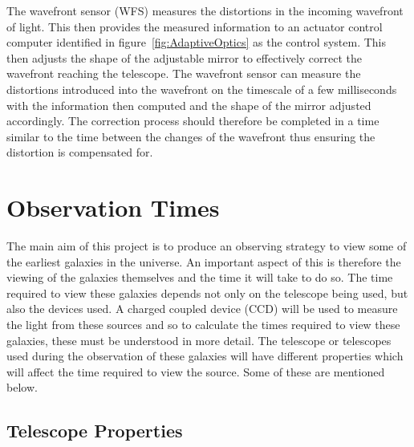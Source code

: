 			The wavefront sensor (WFS) measures the distortions in the incoming wavefront of light. This then provides the measured information to an actuator control computer identified in figure~\ref{fig:AdaptiveOptics} as the control system. This then adjusts the shape of the adjustable mirror to effectively correct the wavefront reaching the telescope\cite{Diffraction_Limited_Imaging_Saha}.  The wavefront sensor can measure the distortions introduced into the wavefront on the timescale of a few milliseconds with the information then computed and the shape of the mirror adjusted accordingly. The correction process should therefore be completed in a time similar to the time between the changes of the wavefront thus ensuring the distortion is compensated for.


\section{Observation Times} %
\label{sec:observation_times}
	The main aim of this project is to produce an observing strategy to view some of the earliest galaxies in the universe. An important aspect of this is therefore the viewing of the galaxies themselves and the time it will take to do so. The time required to view these galaxies depends not only on the telescope being used, but also the devices used. A charged coupled device (CCD) will be used to measure the light from these sources and so to calculate the times required to view these galaxies, these must be understood in more detail. The telescope or telescopes used during the observation of these galaxies will have different properties which will affect the time required to view the source. Some of these are mentioned below.

	\subsection{Telescope Properties} %
	\label{sub:telescope_properties}

